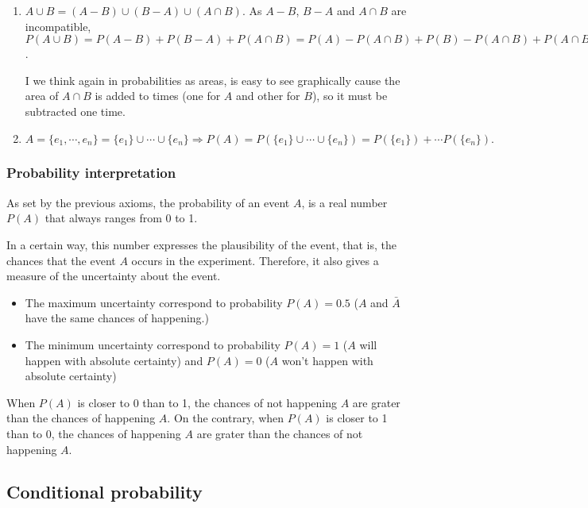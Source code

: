 \begin{frame}
{\begin{enumerate}
\item $A\cup B= (A-B) \cup (B-A) \cup (A\cap B)$. As $A-B$, $B-A$ and $A\cap B$ are incompatible, $P(A\cup
B)=P(A-B)+P(B-A)+P(A\cap B) = P(A)-P(A\cap B)+P(B)-P(A\cap B)+P(A\cap B)= P(A)+P(B)-P(A\cup B)$.

I we think again in probabilities as areas, is easy to see graphically cause the area of $A\cap B$ is added to times
(one for $A$ and other for $B$), so it must be subtracted one time. 
\begin{center}

\end{center}
\item $A=\{e_1,\cdots,e_n\} = \{e_1\}\cup \cdots \cup \{e_n\} \Rightarrow P(A)=P(\{e_1\}\cup \cdots \cup \{e_n\}) =
P(\{e_1\})+ \cdots P(\{e_n\}).$
\end{enumerate}
}
\end{frame}


\begin{frame}
\frametitle{Probability interpretation}
As set by the previous axioms, the probability of an event $A$, is a real number $P(A)$ that always ranges from 0 to 1. 

In a certain way, this number expresses the plausibility of the event, that is, the chances that the event $A$ occurs in the experiment.
Therefore, it also gives a measure of the uncertainty about the event.
\begin{itemize}
\item The maximum uncertainty correspond to probability $P(A)=0.5$ ($A$ and $\bar A$ have the same chances of
happening.)
\item The minimum uncertainty correspond to probability $P(A)=1$ ($A$ will happen with absolute certainty) and $P(A)=0$
($A$ won't happen with absolute certainty)
\end{itemize} 

When $P(A)$ is closer to 0 than to 1, the chances of not happening $A$ are grater than the chances of happening $A$.
On the contrary, when $P(A)$ is closer to 1 than to 0, the chances of happening $A$ are grater than the chances of not
happening $A$.
\end{frame}


\subsection{Conditional probability}

